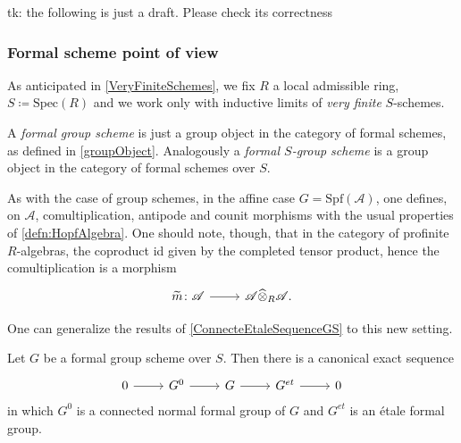 \documentclass[../Main]{subfiles}
\begin{document}
tk: the following is just a draft. Please check its correctness

\subsubsection{Formal scheme point of view}
As anticipated in \cref{VeryFiniteSchemes},
we fix $R$ a local admissible ring, $S \coloneqq \mathrm{Spec}(R)$
and we work only with inductive limits of {\em very finite} $S$-schemes.
\begin{defn}
	A {\em formal group scheme}
	is just a group object in the category of formal schemes,
	 as defined in \cref{groupObject}.
	Analogously a {\em formal $S$-group scheme}
	is a group object in the category of formal schemes over $S$.
\end{defn}


\begin{rem}[]\label{FormalHopf}
	As with the case of group schemes, in the affine case
	$G = \mathrm{Spf}(\mathscr{A})$,
	one defines, on $\mathscr{A}$, comultiplication, antipode and counit morphisms
	with the usual properties of \cref{defn:HopfAlgebra}.
	One should note, though, that in the category of 
	profinite $R$-algebras, the coproduct id given by
	the completed tensor product, hence the comultiplication
	is a morphism
	\begin{equation*}
	\begin{tikzcd}[row sep = 0ex
		,/tikz/column 1/.append style={anchor=base east}
		,/tikz/column 2/.append style={anchor=base west}]
		\widetilde{m}\colon \mathscr{A} \arrow[r, "", rightarrow] &
		\mathscr{A} \widehat{\otimes}_R \mathscr{A}
	.\end{tikzcd}
	\end{equation*} 
\end{rem}


One can generalize the results of \cref{ConnecteEtaleSequenceGS} to this new setting.
\begin{thm}
	Let $G$ be a formal group scheme over $S$.
	Then there is a canonical exact sequence
	\begin{equation*}
	\begin{tikzcd}
		0 \arrow[r, "", rightarrow] &
		G^0 \arrow[r, "", rightarrow] &
		G \arrow[r, "", rightarrow] &
		G^{et} \arrow[r, "", rightarrow] &
		0
	\end{tikzcd}
	\end{equation*}
	in which $G^0$ is a connected normal formal group of $G$
	and $G^{et}$ is an étale formal group.
\end{thm}
\end{document}
